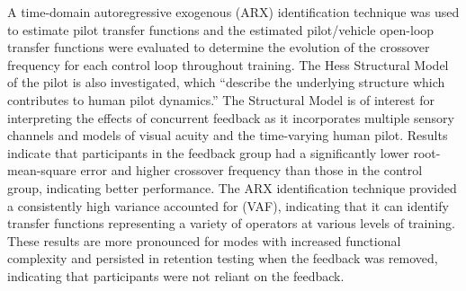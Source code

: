 A time-domain autoregressive exogenous (ARX) identification technique was used to estimate pilot transfer functions and the estimated pilot/vehicle open-loop transfer functions were evaluated to determine the evolution of the crossover frequency for each control loop throughout training.
The Hess Structural Model of the pilot is also investigated, which “describe the underlying structure which contributes to human pilot dynamics.'' The Structural Model is of interest for interpreting the effects of concurrent feedback as it incorporates multiple sensory channels and models of visual acuity and the time-varying human pilot.
Results indicate that participants in the feedback group had a significantly lower root-mean-square error and higher crossover frequency than those in the control group, indicating better performance.
The ARX identification technique provided a consistently high variance accounted for (VAF), indicating that it can identify transfer functions representing a variety of operators at various levels of training.
These results are more pronounced for modes with increased functional complexity and persisted in retention testing when the feedback was removed, indicating that participants were not reliant on the feedback.


